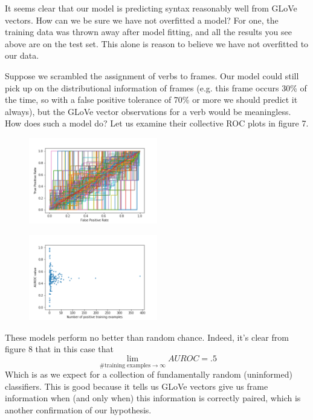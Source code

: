 \documentclass[11pt,a4paper]{article}
\begin{document}
It seems clear that our model is predicting syntax reasonably well from GLoVe vectors. How can we be sure we have not overfitted a model? For one, the training data was thrown away after model fitting, and all the results you see above are on the test set. This alone is reason to believe we have not overfitted to our data.

Suppose we scrambled the assignment of verbs to frames. Our model could still pick up on the distributional information of frames (e.g. this frame occurs 30\% of the time, so with a false positive tolerance of 70\% or more we should predict it always), but the GLoVe vector observations for a verb would be meaningless. How does such a model do? Let us examine their collective ROC plots in figure 7.

\begin{figure}
	\centering
	\includegraphics[width=0.5\textwidth]{auc_plot5rand.png}
	\caption{\label{fig:frog} }
\end{figure}

\begin{figure}
	\centering
	\includegraphics[width=0.5\textwidth]{auc_scatter5rand.png}
	\caption{\label{fig:frog} }
\end{figure}

These models perform no better than random chance. Indeed, it's clear from figure 8 that in this case that 
\[  \lim_{\# \text{training examples} \rightarrow \infty} AUROC = .5 \]
Which is as we expect for a collection of fundamentally random (uninformed) classifiers. This is good because it tells us GLoVe vectors give us frame information when (and only when) this information is correctly paired, which is another confirmation of our hypothesis.
\end{document}
